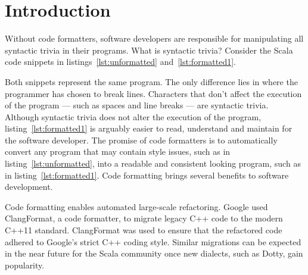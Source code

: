 
\section{Introduction} %
\label{sec:Introduction}
\lstset{style=scala}
Without code formatters, software developers are responsible for manipulating all syntactic trivia in their programs.
What is syntactic trivia?
Consider the Scala code snippets in listings~\ref{lst:unformatted} and~\ref{lst:formatted1}.

\begin{minipage}{.45\textwidth}

\end{minipage}
\hfil
\begin{minipage}{.45\textwidth}

\end{minipage}

Both snippets represent the same program.
The only difference lies in where the programmer has chosen to break lines.
Characters that don't affect the execution of the program --- such as spaces and line breaks --- are syntactic trivia.
Although syntactic trivia does not alter the execution of the program, listing~\ref{lst:formatted1} is arguably easier to read, understand and maintain for the software developer.
The promise of code formatters is to automatically convert any program that may contain style issues, such as in listing~\ref{lst:unformatted}, into a readable and consistent looking program, such as in listing~\ref{lst:formatted1}.
Code formatting brings several benefits to software development.

Code formatting enables automated large-scale refactoring.
Google used ClangFormat\autocite{jasper_clangformat_2013}, a code formatter, to migrate legacy C++ code to the modern C++11 standard\autocite{wright_large-scale_2013}.
ClangFormat was used to ensure that the refactored code adhered to Google's strict C++ coding style\autocite{_google_????}.
Similar migrations can be expected in the near future for the Scala community once new dialects, such as Dotty\autocite{rompf_f_2015}, gain popularity.


